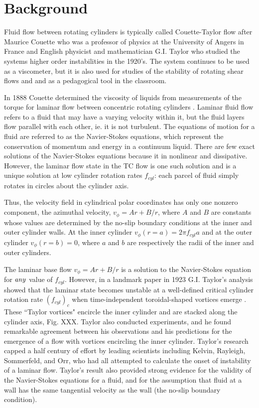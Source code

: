 \documentclass[%
 amsmath,amssymb,
 aps,
floatfix,
aps,prd,longbibliography,
notitlepage
]{revtex4-1}
\begin{document}
\section {Background}
Fluid flow between rotating cylinders is typically called  Couette-Taylor flow after Maurice Couette who was a professor of physics at the University of Angers in France and English physicist and mathematician G.I. Taylor who studied the systems higher order instabilities in the 1920's\cite{couette_taylor}.  The system continues to be used as a viscometer, but it is also used for studies of the stability of rotating shear flows and and as a pedagogical tool in the classroom.

In 1888 Couette determined the viscosity of liquids from measurements of the torque for laminar flow between concentric rotating cylinders \cite{couette}. Laminar fluid flow refers to a fluid that may have a varying velocity within it, but the fluid layers flow parallel with each other, ie. it is not turbulent. The equations of motion for a fluid are referred to as the Navier-Stokes equations, which represent the conservation of momentum and energy in a continuum liquid. There are few exact solutions of the Navier-Stokes equations because it in nonlinear and dissipative. However, the laminar flow state in the TC flow is one such solution and is a unique solution at low cylinder rotation rates $f_{cyl}$: each parcel of fluid simply rotates in circles about the cylinder axis. 
 
 Thus, the velocity field in cylindrical polar coordinates has only one nonzero component, the azimuthal velocity, $v_\phi = Ar + B/r$, where $A$ and $B$ are constants whose values are determined by the no-slip boundary conditions at the inner and outer cylinder walls. At the inner cylinder $v_\phi(r=a)= 2\pi f_{cyl}a$  and at the outer cylinder $v_{\phi}(r=b) = 0$, where $a$ and $b$ are respectively the radii of the inner and outer cylinders.

The laminar base flow $v_\phi = Ar + B/r$ is a solution to the Navier-Stokes equation for $\it any$ value of $f_{cyl}$. However, in a landmark paper in 1923 G.I. Taylor's analysis showed that the laminar state becomes unstable at a well-defined critical cylinder rotation rate $(f_{cyl})_c$ when time-independent toroidal-shaped vortices emerge \cite{Taylor}. These ``Taylor vortices" encircle the inner cylinder and are stacked along the cylinder axis, Fig. XXX.  Taylor also conducted experiments, and he found remarkable agreement between his observations and his predictions for the emergence of a flow with vortices encircling the inner cylinder.  Taylor's research capped a half century of effort by leading scientists including Kelvin, Rayleigh, Sommerfeld, and Orr, who had all attempted to calculate the onset of instability of a laminar flow.  Taylor's result also provided strong evidence for the validity of the Navier-Stokes equations for a fluid, and for the assumption that fluid at a wall has the same tangential velocity as the wall (the no-slip boundary condition).  
\end{document}
